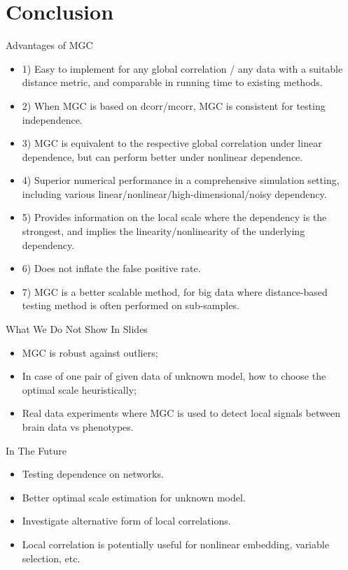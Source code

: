 \documentclass{beamer}
\begin{document}
\section{Conclusion}
\begin{frame}{Advantages of MGC}
\begin{itemize}[<+->]
\item 1) Easy to implement for any global correlation / any data with a suitable distance metric, and comparable in running time to existing methods.
\item 2) When MGC is based on dcorr/mcorr, MGC is consistent for testing independence.
\item 3) MGC is equivalent to the respective global correlation under linear dependence, but can perform better under nonlinear dependence.
\item 4) Superior numerical performance in a comprehensive simulation setting, including various linear/nonlinear/high-dimensional/noisy dependency.
\item 5) Provides information on the local scale where the dependency is the strongest, and implies the linearity/nonlinearity of the underlying dependency.
\item 6) Does not inflate the false positive rate.
\item 7) MGC is a better scalable method, for big data where distance-based testing method is often performed on sub-samples.
\end{itemize}
\end{frame}

\begin{frame}{What We Do Not Show In Slides}
\begin{itemize}[<+->]
\item MGC is robust against outliers;
\item In case of one pair of given data of unknown model, how to choose the optimal scale heuristically;
\item Real data experiments where MGC is used to detect local signals between brain data vs phenotypes.
\end{itemize}
\end{frame}

\begin{frame}{In The Future}
\begin{itemize}[<+->]
\item Testing dependence on networks.
\item Better optimal scale estimation for unknown model.
\item Investigate alternative form of local correlations.
\item Local correlation is potentially useful for nonlinear embedding, variable selection, etc.
\end{itemize}
\end{frame}
\end{document}
